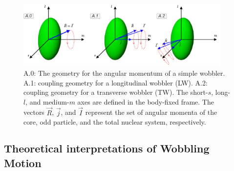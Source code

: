 \documentclass[11pt]{article}
\begin{document}
\begin{figure}
    \centering
    \includegraphics[width=0.95\textwidth]{figs/wobbling_Regimes_COUPLING_SCHEME.pdf}
    \caption{A.0: The geometry for the angular momentum of a simple wobbler. A.1: coupling geometry for a longitudinal wobbler (LW). A.2: coupling geometry for a transverse wobbler (TW). The short-$s$, long-$l$, and medium-$m$ axes are defined in the body-fixed frame. The vectors $\vec{R}$, $\vec{j}$, and $\vec{I}$ represent the set of angular momenta of the core, odd particle, and the total nuclear system, respectively.}
    \label{wobbling-coupling-scheme}
\end{figure}

\subsection{Theoretical interpretations of Wobbling Motion}
\end{document}
